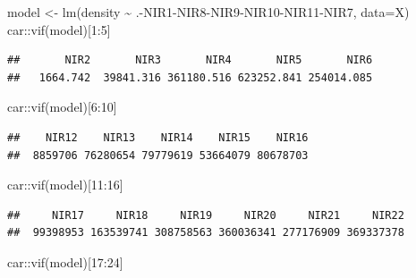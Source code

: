 \documentclass[
]{article}
\newenvironment{Shaded}{\begin{snugshade}}{\end{snugshade}}
\newcommand{\AttributeTok}[1]{\textcolor[rgb]{0.77,0.63,0.00}{#1}}
\newcommand{\DecValTok}[1]{\textcolor[rgb]{0.00,0.00,0.81}{#1}}
\newcommand{\FunctionTok}[1]{\textcolor[rgb]{0.00,0.00,0.00}{#1}}
\newcommand{\NormalTok}[1]{#1}
\newcommand{\OtherTok}[1]{\textcolor[rgb]{0.56,0.35,0.01}{#1}}
\newcommand{\SpecialCharTok}[1]{\textcolor[rgb]{0.00,0.00,0.00}{#1}}
\begin{document}
\begin{Shaded}
\begin{Highlighting}[]
\NormalTok{model }\OtherTok{\textless{}{-}} \FunctionTok{lm}\NormalTok{(density }\SpecialCharTok{\textasciitilde{}}\NormalTok{ .}\SpecialCharTok{{-}}\NormalTok{NIR1}\SpecialCharTok{{-}}\NormalTok{NIR8}\SpecialCharTok{{-}}\NormalTok{NIR9}\SpecialCharTok{{-}}\NormalTok{NIR10}\SpecialCharTok{{-}}\NormalTok{NIR11}\SpecialCharTok{{-}}\NormalTok{NIR7, }\AttributeTok{data=}\NormalTok{X)}
\NormalTok{car}\SpecialCharTok{::}\FunctionTok{vif}\NormalTok{(model)[}\DecValTok{1}\SpecialCharTok{:}\DecValTok{5}\NormalTok{]}
\end{Highlighting}
\end{Shaded}

\begin{verbatim}
##       NIR2       NIR3       NIR4       NIR5       NIR6 
##   1664.742  39841.316 361180.516 623252.841 254014.085
\end{verbatim}

\begin{Shaded}
\begin{Highlighting}[]
\NormalTok{car}\SpecialCharTok{::}\FunctionTok{vif}\NormalTok{(model)[}\DecValTok{6}\SpecialCharTok{:}\DecValTok{10}\NormalTok{]}
\end{Highlighting}
\end{Shaded}

\begin{verbatim}
##    NIR12    NIR13    NIR14    NIR15    NIR16 
##  8859706 76280654 79779619 53664079 80678703
\end{verbatim}

\begin{Shaded}
\begin{Highlighting}[]
\NormalTok{car}\SpecialCharTok{::}\FunctionTok{vif}\NormalTok{(model)[}\DecValTok{11}\SpecialCharTok{:}\DecValTok{16}\NormalTok{]}
\end{Highlighting}
\end{Shaded}

\begin{verbatim}
##     NIR17     NIR18     NIR19     NIR20     NIR21     NIR22 
##  99398953 163539741 308758563 360036341 277176909 369337378
\end{verbatim}

\begin{Shaded}
\begin{Highlighting}[]
\NormalTok{car}\SpecialCharTok{::}\FunctionTok{vif}\NormalTok{(model)[}\DecValTok{17}\SpecialCharTok{:}\DecValTok{24}\NormalTok{]}
\end{Highlighting}
\end{Shaded}
\end{document}
